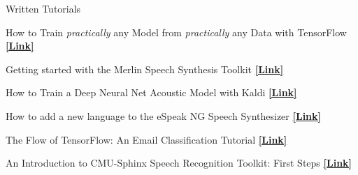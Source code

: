 \documentclass{resume} %
\begin{document}




\begin{minipage}{\textwidth}
\begin{rSection}{Written Tutorials}
  \vspace{.25cm}

  {How to Train \textit{practically} any Model from \textit{practically} any Data with TensorFlow} \hfill \href{http://jrmeyer.github.io/machinelearning/2019/05/29/tensorflow-dataset-estimator-api.html}{\textbf{[Link]}}%

    \vspace{.25cm}

  {Getting started with the Merlin Speech Synthesis Toolkit} \hfill  \href{http://jrmeyer.github.io/tts/2017/02/14/Installing-Merlin.html}{\textbf{[Link]}}%
    \vspace{.25cm}
  
  {How to Train a Deep Neural Net Acoustic Model with Kaldi} \hfill \href{http://jrmeyer.github.io/asr/2016/12/15/DNN-AM-Kaldi.html}{\textbf{[Link]}}%
    \vspace{.25cm}

  {How to add a new language to the eSpeak NG Speech Synthesizer} \hfill \href{http://jrmeyer.github.io/tts/2016/07/03/How-to-Add-a-Language-to-eSpeak-NG.html}{\textbf{[Link]}}%
    \vspace{.25cm}

  {The Flow of TensorFlow: An Email Classification Tutorial} \hfill \href{http://jrmeyer.github.io/machinelearning/2016/02/01/TensorFlow-Tutorial.html}{\textbf{[Link]}}%
    \vspace{.25cm}

  {An Introduction to CMU-Sphinx Speech Recognition Toolkit: First Steps}  \hfill \href{http://jrmeyer.github.io/asr/2016/01/09/Installing-CMU-Sphinx-on-Ubuntu.html}{\textbf{[Link]}}%
 
\end{rSection}
\end{minipage}
\end{document}
